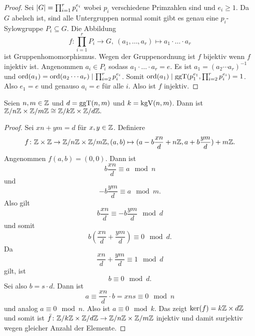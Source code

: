 \begin{proof}
    Sei \(\lvert G\rvert=\prod_{i=1}^rp_i^{e_i}\) wobei \(p_i\) verschiedene Primzahlen sind und \(e_i\geq 1\).
    Da \(G\) abelsch ist, sind alle Untergruppen normal somit gibt es genau eine \(p_i\)-Sylowgruppe \(P_i\subseteq G\). Die Abbildung 
    \[f\colon\prod_{i=1}^rP_i\to G,\ (a_1,\dots,a_r)\mapsto a_1\cdot\dots\cdot a_r\] ist Gruppenhomomorphismus. Wegen der Gruppenordnung ist \(f\) bijektiv wenn \(f\) injektiv ist. Angenommen \(a_i\in P_i\) sodass \(a_1\cdot\dots\cdot a_r=e\). Es ist \(a_1=(a_2\cdots a_r)^{-1}\) und \(\operatorname{ord}(a_1)=\operatorname{ord}(a_2\cdots a_r)\mid\prod_{i=2}^rp_i^{e_i}\).
    Somit \(\operatorname{ord}(a_1)\mid \operatorname{ggT}(p_1^{e_1},\prod_{i=2}^rp_i^{e_i})=1\). Also \(e_1=e\) und genauso \(a_i=e\) für alle \(i\). Also ist \(f\) injektiv.
\end{proof}
\begin{Lemma}\label{Lem:ChinRest1}
    Seien \(n,m\in\mathbb{Z}\) und \(d=\operatorname{ggT}(n,m)\) und \(k=\operatorname{kgV}(n,m)\).
    Dann ist \(\mathbb{Z}/n\mathbb{Z}\times\mathbb{Z}/m\mathbb{Z}\cong \mathbb{Z}/k\mathbb{Z}\times\mathbb{Z}/d\mathbb{Z}.\)
\end{Lemma}
\begin{proof}
    Sei \(xn+ym=d\) für \(x,y\in \mathbb{Z}\).
    Definiere \[f\colon \mathbb{Z}\times \mathbb{Z}\to\mathbb{Z}/n\mathbb{Z}\times\mathbb{Z}/m\mathbb{Z}, (a,b)\mapsto (a-b\frac{xn}{d}+n\mathbb{Z},a+b\frac{ym}{d})+m\mathbb{Z}.\]
    Angenommen \(f(a,b)=(0,0)\). Dann ist \[b\frac{xn}{d}\equiv a \mod n\] und \[-b\frac{ym}{d}\equiv a\mod m.\] Also gilt \[b\frac{xn}{d}\equiv -b\frac{ym}{d} \mod d\] und somit \[b(\frac{xn}{d}+\frac{ym}{d})\equiv 0 \mod d.\] Da \[\frac{xn}{d}+\frac{ym}{d}\equiv 1\mod d\] gilt, ist \[b\equiv 0 \mod d.\] Sei also \(b=s\cdot d\). Dann ist \[a\equiv \frac{xn}{d}\cdot b=xns\equiv 0\mod n\] und analog \(a\equiv 0 \mod n\). Also ist \(a\equiv 0\mod k\). Das zeigt \(\ker(f)=k\mathbb{Z}\times d\mathbb{Z}\) und somit ist \(\bar f\colon \mathbb{Z}/k\mathbb{Z}\times \mathbb{Z}/d\mathbb{Z}\to \mathbb{Z}/n\mathbb{Z}\times \mathbb{Z}/m\mathbb{Z}\) injektiv und damit surjektiv wegen gleicher Anzahl der Elemente.
\end{proof}

